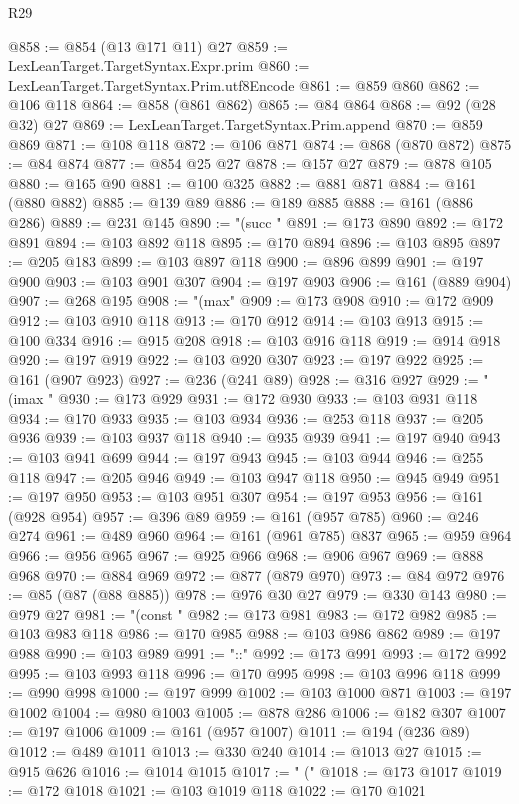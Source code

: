 \begin{lexlean}{R29}
\begin{coremodule}
@858 := @854 (@13 @171 @11) @27
@859 := LexLeanTarget.TargetSyntax.Expr.prim
@860 := LexLeanTarget.TargetSyntax.Prim.utf8Encode
@861 := @859 @860
@862 := @106 @118
@864 := @858 (@861 @862)
@865 := @84 @864
@868 := @92 (@28 @32) @27
@869 := LexLeanTarget.TargetSyntax.Prim.append
@870 := @859 @869
@871 := @108 @118
@872 := @106 @871
@874 := @868 (@870 @872)
@875 := @84 @874
@877 := @854 @25 @27
@878 := @157 @27
@879 := @878 @105
@880 := @165 @90
@881 := @100 @325
@882 := @881 @871
@884 := @161 (@880 @882)
@885 := @139 @89
@886 := @189 @885
@888 := @161 (@886 @286)
@889 := @231 @145
@890 := "(succ "
@891 := @173 @890
@892 := @172 @891
@894 := @103 @892 @118
@895 := @170 @894
@896 := @103 @895
@897 := @205 @183
@899 := @103 @897 @118
@900 := @896 @899
@901 := @197 @900
@903 := @103 @901 @307
@904 := @197 @903
@906 := @161 (@889 @904)
@907 := @268 @195
@908 := "(max"
@909 := @173 @908
@910 := @172 @909
@912 := @103 @910 @118
@913 := @170 @912
@914 := @103 @913
@915 := @100 @334
@916 := @915 @208
@918 := @103 @916 @118
@919 := @914 @918
@920 := @197 @919
@922 := @103 @920 @307
@923 := @197 @922
@925 := @161 (@907 @923)
@927 := @236 (@241 @89)
@928 := @316 @927
@929 := "(imax "
@930 := @173 @929
@931 := @172 @930
@933 := @103 @931 @118
@934 := @170 @933
@935 := @103 @934
@936 := @253 @118
@937 := @205 @936
@939 := @103 @937 @118
@940 := @935 @939
@941 := @197 @940
@943 := @103 @941 @699
@944 := @197 @943
@945 := @103 @944
@946 := @255 @118
@947 := @205 @946
@949 := @103 @947 @118
@950 := @945 @949
@951 := @197 @950
@953 := @103 @951 @307
@954 := @197 @953
@956 := @161 (@928 @954)
@957 := @396 @89
@959 := @161 (@957 @785)
@960 := @246 @274
@961 := @489 @960
@964 := @161 (@961 @785) @837
@965 := @959 @964
@966 := @956 @965
@967 := @925 @966
@968 := @906 @967
@969 := @888 @968
@970 := @884 @969
@972 := @877 (@879 @970)
@973 := @84 @972
@976 := @85 (@87 (@88 @885))
@978 := @976 @30 @27
@979 := @330 @143
@980 := @979 @27
@981 := "(const "
@982 := @173 @981
@983 := @172 @982
@985 := @103 @983 @118
@986 := @170 @985
@988 := @103 @986 @862
@989 := @197 @988
@990 := @103 @989
@991 := "::"
@992 := @173 @991
@993 := @172 @992
@995 := @103 @993 @118
@996 := @170 @995
@998 := @103 @996 @118
@999 := @990 @998
@1000 := @197 @999
@1002 := @103 @1000 @871
@1003 := @197 @1002
@1004 := @980 @1003
@1005 := @878 @286
@1006 := @182 @307
@1007 := @197 @1006
@1009 := @161 (@957 @1007)
@1011 := @194 (@236 @89)
@1012 := @489 @1011
@1013 := @330 @240
@1014 := @1013 @27
@1015 := @915 @626
@1016 := @1014 @1015
@1017 := " ("
@1018 := @173 @1017
@1019 := @172 @1018
@1021 := @103 @1019 @118
@1022 := @170 @1021

\end{coremodule}
\end{lexlean}
